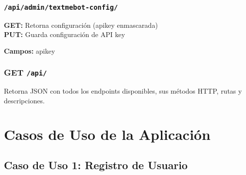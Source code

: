 \documentclass[12pt,a4paper,openany]{article}
\begin{document}
\subsubsection{\texttt{/api/admin/textmebot-config/}}

\begin{infobox}
\textbf{GET:} Retorna configuración (apikey enmascarada) \\
\textbf{PUT:} Guarda configuración de API key

\textbf{Campos:} apikey
\end{infobox}

\subsubsection{GET \texttt{/api/}}

\begin{infobox}
Retorna JSON con todos los endpoints disponibles, sus métodos HTTP, rutas y descripciones.
\end{infobox}

\section{Casos de Uso de la Aplicación}

\subsection{Caso de Uso 1: Registro de Usuario}
\end{document}
